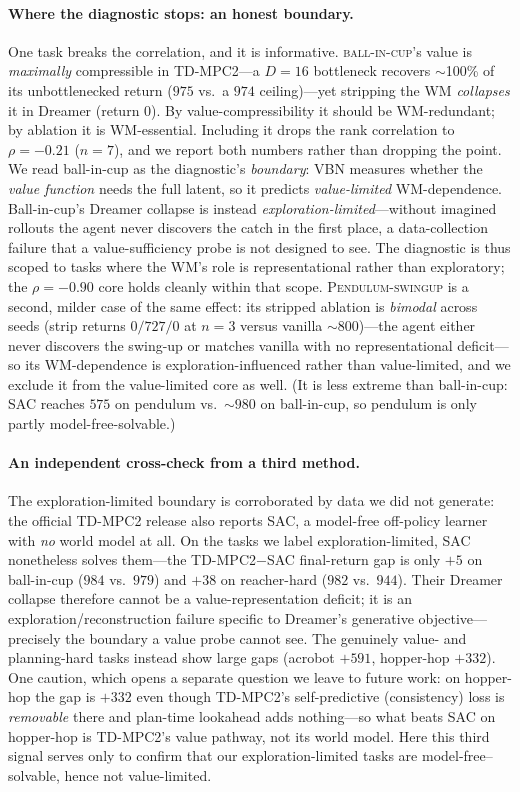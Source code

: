 \documentclass[twocolumn,10pt]{article}
\begin{document}
\paragraph{Where the diagnostic stops: an honest boundary.}
One task breaks the correlation, and it is informative. \textsc{ball-in-cup}'s
value is \emph{maximally} compressible in TD-MPC2---a $D{=}16$ bottleneck
recovers $\sim$100\% of its unbottlenecked return ($975$ vs.\ a $974$
ceiling)---yet stripping the WM \emph{collapses} it in Dreamer (return $0$).
By value-compressibility it should be WM-redundant; by ablation it is
WM-essential. Including it drops the rank correlation to $\rho{=}{-}0.21$
($n{=}7$), and we report both numbers rather than dropping the point. We read
ball-in-cup as the diagnostic's \emph{boundary}: VBN measures whether the
\emph{value function} needs the full latent, so it predicts
\emph{value-limited} WM-dependence. Ball-in-cup's Dreamer collapse is instead
\emph{exploration-limited}---without imagined rollouts the agent never
discovers the catch in the first place, a data-collection failure that a
value-sufficiency probe is not designed to see. The diagnostic is thus scoped
to tasks where the WM's role is representational rather than exploratory; the
$\rho{=}{-}0.90$ core holds cleanly within that scope.
\textsc{Pendulum-swingup} is a second, milder case of the same effect: its
stripped ablation is \emph{bimodal} across seeds (strip returns $0/727/0$ at
$n{=}3$ versus vanilla $\sim$$800$)---the agent either never discovers the
swing-up or matches vanilla with no representational deficit---so its
WM-dependence is exploration-influenced rather than value-limited, and we
exclude it from the value-limited core as well. (It is less extreme than
ball-in-cup: SAC reaches $575$ on pendulum vs.\ $\sim$$980$ on ball-in-cup,
so pendulum is only partly model-free-solvable.)

\paragraph{An independent cross-check from a third method.}
The exploration-limited boundary is corroborated by data we did not generate:
the official TD-MPC2 release \cite{hansen2024tdmpc2} also reports SAC, a
model-free off-policy learner with \emph{no} world model at all. On the tasks
we label exploration-limited, SAC nonetheless solves them---the
TD-MPC2$-$SAC final-return gap is only $+5$ on ball-in-cup ($984$ vs.\ $979$)
and $+38$ on reacher-hard ($982$ vs.\ $944$). Their Dreamer collapse therefore
cannot be a value-representation deficit; it is an exploration/reconstruction
failure specific to Dreamer's generative objective---precisely the boundary a
value probe cannot see. The genuinely value- and planning-hard tasks instead
show large gaps (acrobot $+591$, hopper-hop $+332$). One caution, which opens a
separate question we leave to future work: on hopper-hop the gap is $+332$ even
though TD-MPC2's self-predictive (consistency) loss is \emph{removable} there
and plan-time lookahead adds nothing---so what beats SAC on hopper-hop is
TD-MPC2's value pathway, not its world model. Here this third signal serves
only to confirm that our exploration-limited tasks are model-free--solvable,
hence not value-limited.
\end{document}

